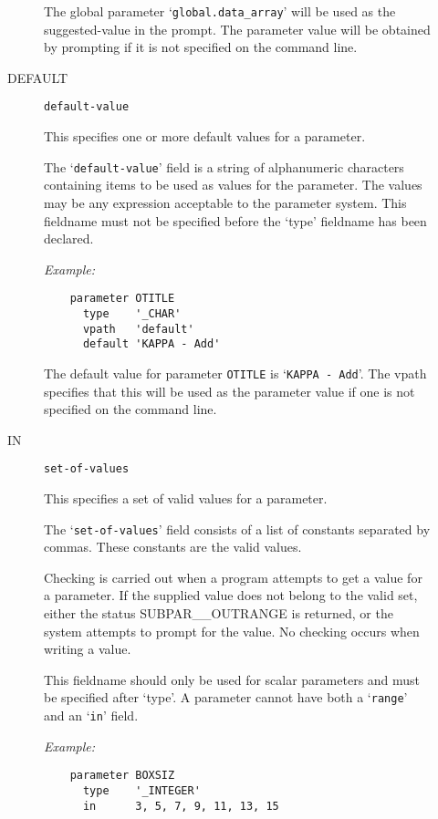 \begin{description}
\begin{description}
The global parameter `\verb+global.data_array+' will be used as the
suggested-value in the prompt.
The parameter value will be obtained by prompting if it is not specified on
the command line.

\item [DEFAULT] {\tt default-value}

This specifies one or more default values for a parameter.

The `\verb+default-value+' field is a string of alphanumeric characters 
containing items to be used as values for the parameter.
The values may be any expression acceptable to the parameter system.
This fieldname must not be specified before the `type' fieldname has been
declared.

{\em Example:}

\begin{small}
\begin{verbatim}
    parameter OTITLE
      type    '_CHAR'
      vpath   'default'
      default 'KAPPA - Add'
\end{verbatim}
\end{small}

The default value for parameter \verb+OTITLE+ is `\verb+KAPPA - Add+'.
The vpath specifies that this will be used as the parameter value if one
is not specified on the command line.

\item [IN] {\tt set-of-values}

This specifies a set of valid values for a parameter.

The `\verb+set-of-values+' field consists of a list of constants separated by
commas.
These constants are the valid values.

Checking is carried out when a program attempts to get a value for a parameter.
If the supplied value does not belong to the valid set, either the status
SUBPAR\_\_OUTRANGE is returned, or the system attempts to prompt for the value.
No checking occurs when writing a value.

This fieldname should only be used for scalar parameters and must be specified
after `type'.
A parameter cannot have both a `\verb+range+' and an `\verb+in+' field.

{\em Example:}

\begin{small}
\begin{verbatim}
    parameter BOXSIZ
      type    '_INTEGER'
      in      3, 5, 7, 9, 11, 13, 15
\end{verbatim}
\end{small}


\end{description}
\end{description}
